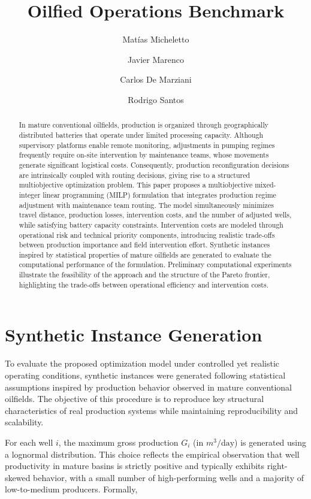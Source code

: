 \documentclass[a4paper]{article}
\title{Oilfied Operations Benchmark}
\author{
    Matías Micheletto \and 
    Javier Marenco \and 
    Carlos De Marziani \and 
    Rodrigo Santos
}
\begin{document}
\maketitle

\begin{abstract}
    In mature conventional oilfields, production is organized through geographically distributed batteries that operate under limited processing capacity. Although supervisory platforms enable remote monitoring, adjustments in pumping regimes frequently require on-site intervention by maintenance teams, whose movements generate significant logistical costs. Consequently, production reconfiguration decisions are intrinsically coupled with routing decisions, giving rise to a structured multiobjective optimization problem. This paper proposes a multiobjective mixed-integer linear programming (MILP) formulation that integrates production regime adjustment with maintenance team routing. The model simultaneously minimizes travel distance, production losses, intervention costs, and the number of adjusted wells, while satisfying battery capacity constraints. Intervention costs are modeled through operational risk and technical priority components, introducing realistic trade-offs between production importance and field intervention effort. Synthetic instances inspired by statistical properties of mature oilfields are generated to evaluate the computational performance of the formulation. Preliminary computational experiments illustrate the feasibility of the approach and the structure of the Pareto frontier, highlighting the trade-offs between operational efficiency and intervention costs.
\end{abstract}


\section{Synthetic Instance Generation} \label{sec:instances}

To evaluate the proposed optimization model under controlled yet realistic operating conditions, synthetic instances were generated following statistical assumptions inspired by production behavior observed in mature conventional oilfields. The objective of this procedure is to reproduce key structural characteristics of real production systems while maintaining reproducibility and scalability.

For each well $i$, the maximum gross production $G_i$ (in $m^3/\text{day}$) is generated using a lognormal distribution. This choice reflects the empirical observation that well productivity in mature basins is strictly positive and typically exhibits right-skewed behavior, with a small number of high-performing wells and a majority of low-to-medium producers. Formally,
\end{document}
